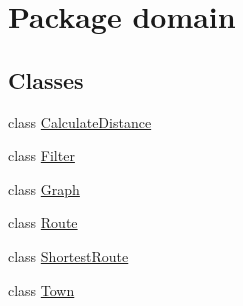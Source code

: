 \hypertarget{namespacedomain}{}\section{Package domain}
\label{namespacedomain}
\subsection*{Classes}
\begin{DoxyCompactItemize}
\item 
class \hyperlink{classdomain_1_1_calculate_distance}{Calculate\+Distance}
\item 
class \hyperlink{classdomain_1_1_filter}{Filter}
\item 
class \hyperlink{classdomain_1_1_graph}{Graph}
\item 
class \hyperlink{classdomain_1_1_route}{Route}
\item 
class \hyperlink{classdomain_1_1_shortest_route}{Shortest\+Route}
\item 
class \hyperlink{classdomain_1_1_town}{Town}
\end{DoxyCompactItemize}
